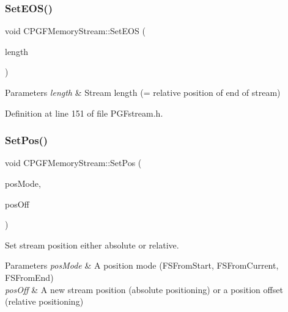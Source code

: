 \subsubsection{\texorpdfstring{SetEOS()}{SetEOS()}}
{\footnotesize\ttfamily void C\+P\+G\+F\+Memory\+Stream\+::\+Set\+E\+OS (\begin{DoxyParamCaption}\item[{U\+I\+N\+T64}]{length }\end{DoxyParamCaption})\hspace{0.3cm}{\ttfamily [inline]}}


\begin{DoxyParams}{Parameters}
{\em length} & Stream length (= relative position of end of stream) \\
\hline
\end{DoxyParams}


Definition at line 151 of file P\+G\+Fstream.\+h.


\begin{DoxyCode}{0}

\end{DoxyCode}
\mbox{\label{classCPGFMemoryStream_a28e8defe72f535c49535c40ffe2ad299}} 
\subsubsection{\texorpdfstring{SetPos()}{SetPos()}}
{\footnotesize\ttfamily void C\+P\+G\+F\+Memory\+Stream\+::\+Set\+Pos (\begin{DoxyParamCaption}\item[{short}]{pos\+Mode,  }\item[{I\+N\+T64}]{pos\+Off }\end{DoxyParamCaption})\hspace{0.3cm}{\ttfamily [virtual]}}

Set stream position either absolute or relative. 
\begin{DoxyParams}{Parameters}
{\em pos\+Mode} & A position mode (F\+S\+From\+Start, F\+S\+From\+Current, F\+S\+From\+End) \\
\hline
{\em pos\+Off} & A new stream position (absolute positioning) or a position offset (relative positioning) \\
\hline
\end{DoxyParams}


